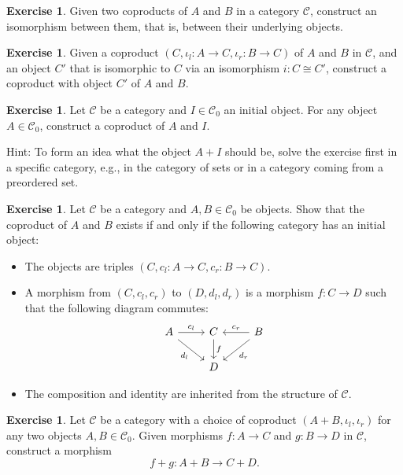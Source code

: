 \documentclass[a4paper,10pt]{scrartcl}
\theoremstyle{plain}
\theoremstyle{definition}
\newtheorem{exer}[thm]{Exercise}
\newcommand{\Cat}[1]{\mathcal{#1}}
\newcommand{\CC}{\Cat{C}}
\newcommand{\Ob}[1]{{#1}_0}
\newcommand{\inl}{\ensuremath{\iota_l}}
\newcommand{\inr}{\ensuremath{\iota_r}}
\begin{document}
\begin{exer}\label{exer:coproduct-unique}
  Given two coproducts of $A$ and $B$ in a category $\CC$, construct an isomorphism between them, that is, between their underlying objects.
\end{exer}

\begin{exer}\label{exer:coproduct_preserved_by_iso}
  Given a coproduct $(C,\inl : A \to C ,\inr : B \to C)$ of $A$ and $B$ in $\CC$, and an object $C'$ that is isomorphic to $C$ via an isomorphism $i : C \cong C'$, construct a coproduct with object $C'$ of $A$ and $B$.
\end{exer}

\begin{exer}\label{exer:coproduct_with_initial} Let $\CC$ be a category and $I\in\Ob{\CC}$ an initial object.
  For any object $A\in \Ob{\CC}$, construct a coproduct of $A$ and $I$.

  Hint: To form an idea what the object $A + I$ should be, solve the exercise first in a specific category, e.g., in the category of sets or in a category coming from a preordered set.
\end{exer}

\begin{exer}\label{exer:coproduct_iff_initial_in_subcategory} Let $\CC$ be a category and $A,B\in\Ob{\CC}$ be objects. Show that the coproduct of $A$ and $B$ exists if and only if the following category has an initial object:
\begin{itemize}
\item The objects are triples $(C,c_l: A\to C, c_r:B\to C)$.
\item A morphism from $(C,c_l,c_r)$ to $(D,d_l,d_r)$ is a morphism $f : C \to D$ such that the following diagram commutes:
\[
    \begin{tikzcd}
      A \ar[r, "c_l"] \ar[rd, "d_l"']
      &
      C  \ar[d, "f"]
      &
      B \ar[l, "c_r"'] \ar[ld, "d_r"]
      \\
      &
      D
    \end{tikzcd}
  \]
\item The composition and identity are inherited from the structure of $\CC$.
\end{itemize}
\end{exer}

\begin{exer}\label{exer:coproduct_of_morphisms}
  Let $\CC$ be a category with a choice of coproduct $(A + B, \inl, \inr)$ for any two objects $A,B\in \Ob{\CC}$.
  Given morphisms $f : A \to C$ and $g : B \to D$ in $\CC$, construct a morphism
  \[ f + g : A + B \to C + D.\]
\end{exer}
\end{document}
